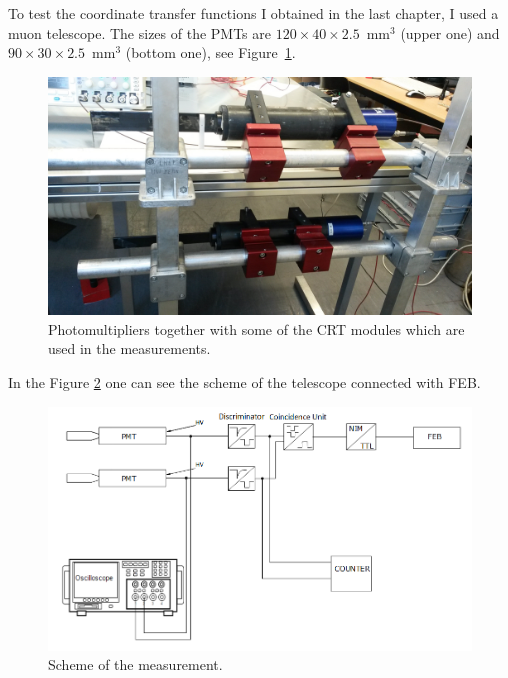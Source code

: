 \documentclass[a4paper]{article}\linespread{1.4}
\begin{document}
To test the coordinate transfer functions I obtained in the last chapter, I used a muon telescope. The sizes of the PMTs are $120\times40\times2.5$~$\mathrm{{mm}^3}$ (upper one) and $90\times30\times2.5$~$\mathrm{{mm}^3}$ (bottom one), see Figure~\ref{fig:2}. \begin{figure}[h!] \centering \includegraphics[width=120mm,scale=1.0]{figures/2.jpg} \caption{Photomultipliers together with some of the CRT modules which are used in the measurements.} \label{fig:2} \end{figure}
In the Figure \ref{fig:scheme} one can see the scheme of the telescope connected with FEB.
\begin{figure}[h!] \centering \includegraphics[width=120mm,scale=1.0]{figures/scheme.png} \caption{Scheme of the measurement.} \label{fig:scheme} \end{figure}  
\end{document}
